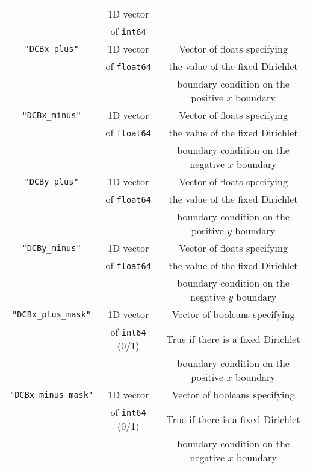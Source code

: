 \documentclass[11pt]{article}
\begin{document}
\begin{table}
\begin{tabular}{c | c | c}
            & 1D vector & \\
            & of \texttt{int64} & \\
            \hline
            \texttt{"DCBx\_plus"} & 1D vector & Vector of floats specifying \\
            & of \texttt{float64} & the value of the fixed Dirichlet \\
            & & boundary condition on the positive \(x\) boundary \\
            \hline
            \texttt{"DCBx\_minus"} & 1D vector & Vector of floats specifying \\
            & of \texttt{float64} & the value of the fixed Dirichlet \\
            & & boundary condition on the negative \(x\) boundary \\
            \hline
            \texttt{"DCBy\_plus"} & 1D vector & Vector of floats specifying \\
            & of \texttt{float64} & the value of the fixed Dirichlet \\
            & & boundary condition on the positive \(y\) boundary \\
            \hline
            \texttt{"DCBy\_minus"} & 1D vector & Vector of floats specifying \\
            & of \texttt{float64} & the value of the fixed Dirichlet \\
            & & boundary condition on the negative \(y\) boundary \\
            \hline
            \texttt{"DCBx\_plus\_mask"} & 1D vector & Vector of booleans specifying \\
            & of \texttt{int64} (0/1) & True if there is a fixed Dirichlet \\
            & & boundary condition on the positive \(x\) boundary \\
            \hline
            \texttt{"DCBx\_minus\_mask"} & 1D vector & Vector of booleans specifying \\
            & of \texttt{int64} (0/1) & True if there is a fixed Dirichlet \\
            & & boundary condition on the negative \(x\) boundary \\

        \end{tabular}
    \end{table}
\end{document}
